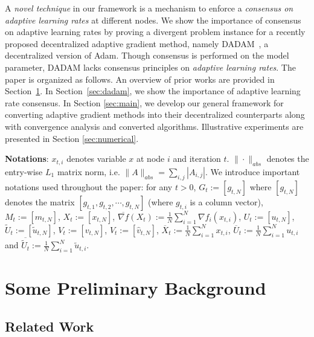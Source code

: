 \documentclass[anon,12pt]{colt2021} %
\begin{document}
A \emph{novel technique} in our framework is a mechanism to enforce a \emph{consensus on adaptive learning rates} at different nodes. 
We show the importance of consensus on adaptive learning rates by proving a divergent problem instance for a recently proposed decentralized adaptive gradient method, namely DADAM~\citep{nazari2019dadam}, a decentralized version of Adam. 
Though consensus is performed on the model parameter, DADAM lacks consensus principles on \emph{adaptive learning rates}. 
The paper is organized as follows. 
An overview of prior works are provided in Section~\ref{sec:prelim}.
In Section~\ref{sec:dadam}, we show the importance of adaptive learning rate consensus. In Section \ref{sec:main}, we develop our general framework for converting adaptive gradient methods into their decentralized counterparts along with convergence analysis and converted algorithms. Illustrative experiments are presented in Section \ref{sec:numerical}. 

 \textbf{Notations}: $x_{t,i}$ denotes variable $x$ at node $i$ and iteration $t$. $\|\cdot \|_{abs}$ denotes the entry-wise $L_1$ matrix norm, i.e. $\|A\|_{abs}= \sum_{i,j} |A_{i,j}|$. 
We introduce important notations used throughout the paper: for any $t>0$, $G_t := [g_{t,N}]$ where $[g_{t,N}]$ denotes the matrix $[g_{t,1}, g_{t,2}, \cdots, g_{t,N}]$ (where $g_{t,i}$ is a column vector), $M_t := [m_{t,N}]$, $X_t := [x_{t,N}]$, $\overline {\nabla f}(X_t) := \frac{1}{N}\sum_{i=1}^N \nabla f_i(x_{t,i})$, $U_t := [u_{t,N}]$, $ \tilde U_t := [\tilde u_{t,N}]$, $ V_t := [ v_{t,N}]$, $\hat V_t := [\hat v_{t,N}]$, $\overline X_t := \frac{1}{N}\sum_{i=1}^N x_{t,i} $, $\overline U_t := \frac{1}{N}\sum_{i=1}^N u_{t,i} $ and $\overline {\tilde U_t} := \frac{1}{N}\sum_{i=1}^N  \tilde u_{t,i} $. 


 
\vspace{-0.05in}
\section{Some Preliminary Background}\label{sec:prelim}
\vspace{-0.05in}

\subsection{Related Work}
\vspace{-0.05in}
\end{document}

